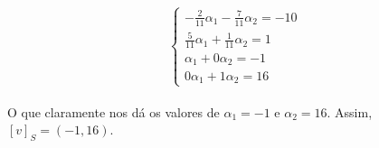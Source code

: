 \begin{enumerate}
          \[
              \begin{cases}
                  -\frac{2}{11}\alpha_1 - \frac{7}{11}\alpha_2 = -10 \\
                  \frac{5}{11}\alpha_1 + \frac{1}{11}\alpha_2 = 1    \\
                  \alpha_1 + 0\alpha_2 = -1                          \\
                  0\alpha_1 + 1\alpha_2 = 16
              \end{cases}
          \]
          \\

          O que claramente nos dá os valores de $\alpha_1=-1$ e $\alpha_2=16$. Assim, $[v]_S=(-1,16)$.
\end{enumerate}

